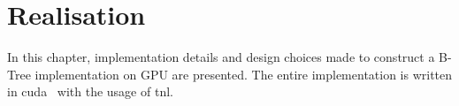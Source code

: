 \chapter{Realisation}\label{chapter:realisation}

In this chapter, implementation details and design choices made to construct a B-Tree implementation on GPU are presented. The entire implementation is written in \acrshort{cuda} \CC\ with the usage of \acrshort{tnl}.









